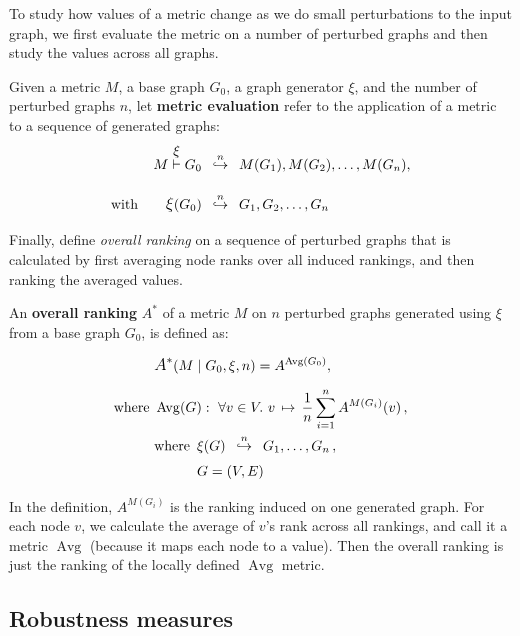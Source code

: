 To study how values of a metric change as we do small perturbations to the input graph, we first evaluate the metric on a number of perturbed graphs and then study the values across all graphs.

Given a metric $M$, a base graph $G_0$, a graph generator $\xi$, and the number of perturbed graphs $n$, let \textbf{metric evaluation} refer to the application of a metric to a sequence of generated graphs:
\begin{align}
    M \overset{\mathlarger{\xi}}{\vdash} G_0 &\generates{n} M(G_1), M(G_2), \dots, M(G_n), \\[10pt]
    \text{with}\qquad \mathlarger{\xi}(G_0) &\generates{n} G_1, G_2, \dots, G_n \nonumber
\end{align}

Finally, define \textsl{overall ranking} on a sequence of perturbed graphs that is calculated by first averaging node ranks over all induced rankings, and then ranking the averaged values.

\begin{definition}
    \label{def:overall_ranking}
    An \textbf{overall ranking} $A^*$ of a metric $M$ on $n$ perturbed graphs generated using $\xi$ from a base graph $G_0$, is defined as:

    \begin{align*}
        &\mathlarger{A^*}\!\left( M \mid G_0, \xi, n \right) = A^{\operatorname{Avg}(G_0)} ,\\[5pt]
        \text{where}~&\operatorname{Avg}(G) :\ \forall v \in V.\ v \,\mapsto\, \frac{1}{n} \sum_{i=1}^n A^{M(G_i)}(v)\, , \\
        &\begin{aligned}
             \text{where}~\,&\xi(G) \generates{n} G_1, \dots, G_n\,, \\
             & G = (V, E)
        \end{aligned}
    \end{align*}
\end{definition}

In the definition, $A^{M(G_i)}$ is the ranking induced on one generated graph.
For each node $v$, we calculate the average of $v$'s rank across all rankings, and call it a metric $\operatorname{Avg}$ (because it maps each node to a value).
Then the overall ranking is just the ranking of the locally defined $\operatorname{Avg}$ metric.

\subsection{Robustness measures}\label{sec:robustness_measures}

